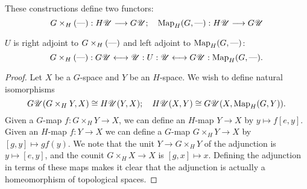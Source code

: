 \documentclass[11pt]{article}
\begin{document}
\begin{FirstNineLectures}
These constructions define two functors:
\[G\times_H(\textup{---}):H\mathscr{U}\longrightarrow G\mathscr{U}; \hspace{10pt}
\textup{Map}_H(G,\textup{---}):H\mathscr{U}\longrightarrow G\mathscr{U}\]
\begin{thm*} $U$ is right adjoint to $G\times_H(\textup{---})$ and left adjoint to $\textup{Map}_H(G,\textup{---})$:
\[G\times_H(\textup{---}):G\mathscr{U}\longleftrightarrow\mathscr{U}: U:\mathscr{U}\longleftrightarrow G\mathscr{U}: \operatorname{Map}_H(G,\textup{---}).\]
\end{thm*}
\begin{proof} Let $X$ be a $G$-space and $Y$ be an $H$-space. We wish to define natural isomorphisms
\[G\mathscr{U}(G\times_H Y,X)\cong H\mathscr{U}(Y,X);\hspace{10pt}
H\mathscr{U}(X,Y)\cong G\mathscr{U}(X,\textup{Map}_H(G,Y)).\]
Given a $G$-map $f:G\times_H Y\to X$, we can define an $H$-map $Y\to X$ by $y\mapsto f[e,y]$. Given an $H$-map $f:Y\to X$ we can define a $G$-map $G\times_H Y\to X$ by $[g,y]\mapsto gf(y)$. We note that the unit $Y\to G\times_H Y$ of the adjunction is $y\mapsto [e,y]$, and the counit $G\times_H X\to X$ is $[g,x]\mapsto x$. Defining the adjunction in terms of these maps makes it clear that the adjunction is actually a homeomorphism of topological spaces.


\end{proof}
\end{FirstNineLectures}
\end{document}
